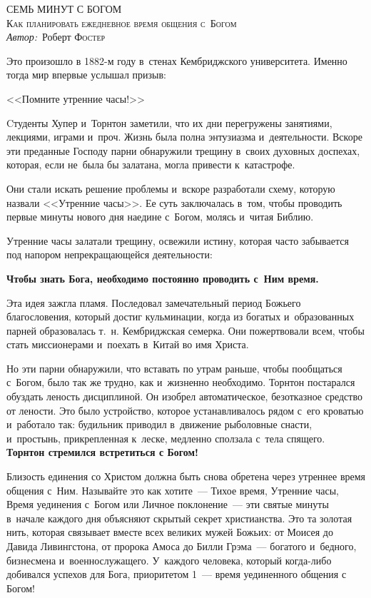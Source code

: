 \documentclass[11pt,article,a4paper,fittopage,oneside]{article}
\begin{document}
\begin{center}
\textsc{\LARGE СЕМЬ МИНУТ С БОГОМ}\\[0.5 cm]
\textsc{\Large Как планировать ежедневное время общения с~Богом}\\[0.5cm]
\emph{Автор:}\ Роберт \textsc{Фостер}
\end{center}

\setcounter{page}{1}
\thispagestyle{empty}

\begin{multicols}{2}

Это произошло в 1882-м году в~стенах Кембриджского университета. Именно тогда мир впервые услышал призыв:
\begin{center}
<<Помните утренние часы!>>
\end{center}
Cтуденты Хупер и~Торнтон заметили, что их дни перегружены занятиями, лекциями, играми и~проч. Жизнь была полна энтузиазма и~деятельности. Вскоре эти преданные Господу парни обнаружили трещину в~своих духовных доспехах, которая, если не~была бы залатана, могла привести к~катастрофе.

Они стали искать решение проблемы и~вскоре разработали схему, которую назвали <<Утренние часы>>. Ее суть заключалась в~том, чтобы проводить первые минуты нового дня наедине с~Богом, молясь и~читая Библию.

Утренние часы залатали трещину, освежили истину, которая часто забывается под напором непрекращающейся деятельности:

\begin{center}
\textbf{Чтобы знать Бога, необходимо постоянно проводить с~Ним время.}
\end{center}

Эта идея зажгла пламя. Последовал замечательный период Божьего благословения, который достиг кульминации, когда из богатых и~образованных парней образовалась т.~н. Кембриджская семерка. Они пожертвовали всем, чтобы стать миссионерами и~поехать в~Китай во имя Христа.

Но эти парни обнаружили, что вставать по утрам раньше, чтобы пообщаться с~Богом, было так же трудно, как и~жизненно необходимо. Торнтон постарался обуздать леность дисциплиной. Он изобрел автоматическое, безотказное средство от лености. Это было устройство, которое устанавливалось рядом с~его кроватью и~работало так: будильник приводил в~движение рыболовные снасти, и~простынь, прикрепленная к~леске, медленно сползала с~тела спящего. \textbf{Торнтон стремился встретиться с Богом!}

Близость единения со Христом должна быть снова обретена через утреннее время общения с~Ним. Называйте это как хотите~--- Тихое время, Утренние часы, Время уединения с~Богом или Личное поклонение~--- эти святые минуты в~начале каждого дня объясняют скрытый секрет христианства. Это та золотая нить, которая связывает вместе всех великих мужей Божьих: от Моисея до Давида Ливингстона, от пророка Амоса до Билли Грэма~--- богатого и~бедного, бизнесмена и~военнослужащего. У~каждого человека, который когда-либо добивался успехов для Бога, приоритетом \textnumero{}1~--- время уединенного общения с Богом!


\end{multicols}
\end{document}
